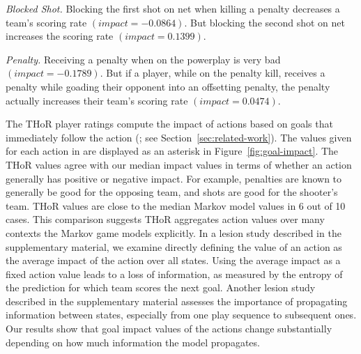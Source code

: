 \documentclass[]{article}
\begin{document}
{\em Blocked Shot.} Blocking the first shot on net when killing a penalty decreases a team's scoring rate $(impact=-0.0864)$. But blocking the second shot on net increases the scoring rate $(impact=0.1399)$.

{\em Penalty.} Receiving a penalty when on the powerplay is very bad $(impact=-0.1789)$. But if a player, while on the penalty kill, receives a penalty while goading their opponent into an offsetting penalty, the penalty actually increases their team's scoring rate $(impact=0.0474)$.

The THoR player ratings compute the impact of actions based on goals that immediately follow the action (\citep{Lock2009,Schuckers2011}; see Section~\ref{sec:related-work}).
The values given for each action in \citep{Lock2009} are displayed as an asterisk in Figure~\ref{fig:goal-impact}.
%
The THoR values
agree with our median impact values in terms of whether an action generally has positive or negative impact. For example, penalties are known to generally be good for the opposing team, and shots are good for the shooter's team. THoR values are close to the median Markov model values in 6 out of 10 cases.
This comparison suggests THoR aggregates action values over many contexts the Markov game models explicitly. In a lesion study described in the supplementary material, we examine directly defining the value of an action as the average impact of the action over all states. Using the average impact as a fixed action value leads to a loss of information, as measured by the entropy of the prediction for which team scores the next goal. Another lesion study described in the supplementary material assesses the importance of propagating information between states, especially from one play sequence to subsequent ones. Our results show that goal impact values of the actions change substantially depending on how much information the model propagates.
\end{document}
